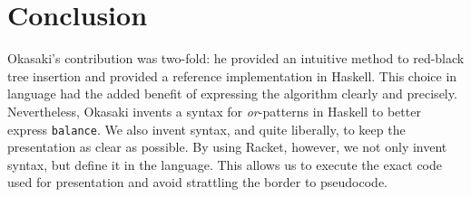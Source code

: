 \documentclass[preprint]{sigplanconf}
\begin{document}
\section{Conclusion}

Okasaki's contribution was two-fold: he provided an intuitive method to red-black tree insertion and provided a reference implementation in Haskell\cite{hudak1992report}. This choice in language had the added benefit of expressing the algorithm clearly and precisely. Nevertheless, Okasaki invents a syntax for \emph{or}-patterns in Haskell to better express \texttt{balance}. We also invent syntax, and quite liberally, to keep the presentation as clear as possible. By using Racket, however, we not only invent syntax, but define it in the language. This allows us to execute the exact code used for presentation and avoid strattling the border to pseudocode.










\end{document}
